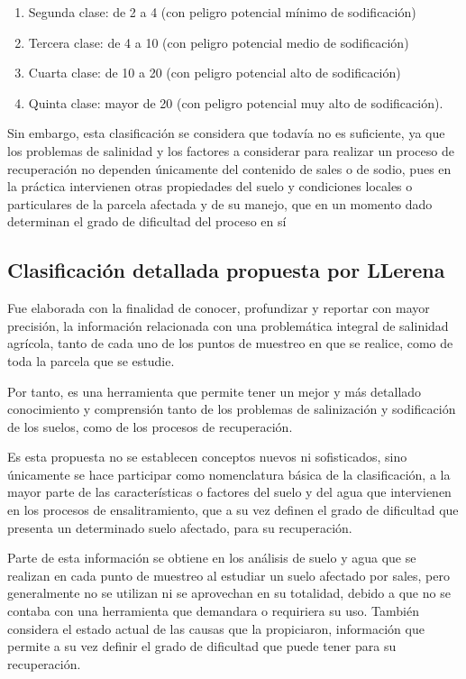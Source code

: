 \begin{enumerate}
\begin{enumerate}
        \item Segunda clase: de 2 a 4 (con peligro potencial mínimo de sodificación)
        \item Tercera clase: de 4 a 10 (con peligro potencial medio de sodificación)
        \item Cuarta clase: de 10 a 20 (con peligro potencial alto de sodificación)
        \item Quinta clase: mayor de 20 (con peligro potencial muy alto de sodificación).    
    \end{enumerate}
    Sin embargo, esta clasificación se considera que todavía no es suficiente, ya que los problemas de salinidad y los factores a considerar para realizar un proceso de recuperación no dependen únicamente del contenido de sales o de sodio, pues en la práctica intervienen otras propiedades del suelo y condiciones locales o particulares de la parcela afectada y de su manejo, que en un momento dado determinan el grado de dificultad del proceso en sí    
\end{enumerate}
\subsection{Clasificación detallada propuesta por LLerena}
Fue elaborada con la finalidad de conocer, profundizar y reportar con mayor precisión, la información relacionada con una problemática integral de salinidad agrícola, tanto de cada uno de los puntos de muestreo en que se realice, como de toda la parcela que se estudie.

Por tanto, es una herramienta que permite tener un mejor y más detallado conocimiento y comprensión tanto de los problemas de salinización y sodificación de los suelos, como de los procesos de recuperación.

Es esta propuesta no se establecen conceptos nuevos ni sofisticados, sino únicamente se hace participar como nomenclatura básica de la clasificación, a la mayor parte de las características o factores del suelo y del agua que intervienen en los procesos de ensalitramiento, que a su vez definen el grado de dificultad que presenta un determinado suelo afectado, para su recuperación.

Parte de esta información se obtiene en los análisis de suelo y agua que se realizan en cada punto de muestreo al estudiar un suelo afectado por sales, pero generalmente no se utilizan ni se aprovechan en su totalidad, debido a que no se contaba con una herramienta que demandara o requiriera su uso. También considera el estado actual de las causas que la propiciaron, información que permite a su vez definir el grado de dificultad que puede tener para su recuperación.


